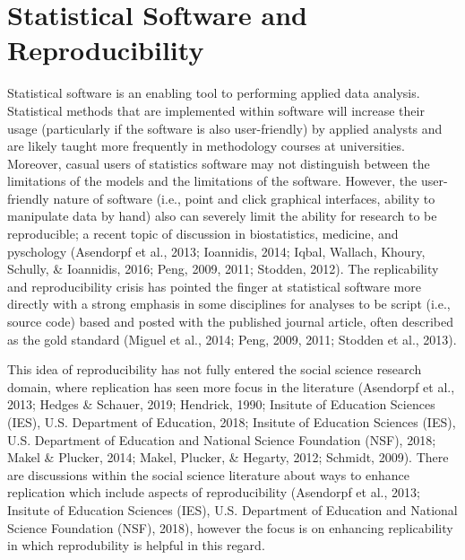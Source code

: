 \documentclass[
  english,
  ,man]{apa6}
\begin{document}
\hypertarget{statistical-software-and-reproducibility}{%
\section{Statistical Software and Reproducibility}\label{statistical-software-and-reproducibility}}

Statistical software is an enabling tool to performing applied data analysis. Statistical methods that are implemented within software will increase their usage (particularly if the software is also user-friendly) by applied analysts and are likely taught more frequently in methodology courses at universities. Moreover, casual users of statistics software may not distinguish between the limitations of the models and the limitations of the software. However, the user-friendly nature of software (i.e., point and click graphical interfaces, ability to manipulate data by hand) also can severely limit the ability for research to be reproducible; a recent topic of discussion in biostatistics, medicine, and pyschology (Asendorpf et al., 2013; Ioannidis, 2014; Iqbal, Wallach, Khoury, Schully, \& Ioannidis, 2016; Peng, 2009, 2011; Stodden, 2012). The replicability and reproducibility crisis has pointed the finger at statistical software more directly with a strong emphasis in some disciplines for analyses to be script (i.e., source code) based and posted with the published journal article, often described as the gold standard (Miguel et al., 2014; Peng, 2009, 2011; Stodden et al., 2013).

This idea of reproducibility has not fully entered the social science research domain, where replication has seen more focus in the literature (Asendorpf et al., 2013; Hedges \& Schauer, 2019; Hendrick, 1990; Insitute of Education Sciences (IES), U.S. Department of Education, 2018; Insitute of Education Sciences (IES), U.S. Department of Education and National Science Foundation (NSF), 2018; Makel \& Plucker, 2014; Makel, Plucker, \& Hegarty, 2012; Schmidt, 2009). There are discussions within the social science literature about ways to enhance replication which include aspects of reproducibility (Asendorpf et al., 2013; Insitute of Education Sciences (IES), U.S. Department of Education and National Science Foundation (NSF), 2018), however the focus is on enhancing replicability in which reprodubility is helpful in this regard.
\end{document}
